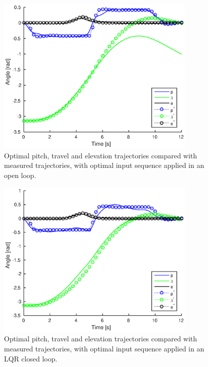 \begin{figure}[hp]
	\centering
		\includegraphics[width=0.85\textwidth]{figures/4/openloop25.eps}
	\caption{Optimal pitch, travel and elevation trajectories compared with measured trajectories, with optimal input sequence applied in an open loop.}
	\label{fig:openloop25}
\end{figure}

\begin{figure}[hp]
	\centering
		\includegraphics[width=0.85\textwidth]{figures/4/closedloop25.eps}
	\caption{Optimal pitch, travel and elevation trajectories compared with measured trajectories, with optimal input sequence applied in an LQR closed loop.}
	\label{fig:closedloop25}
\end{figure}

